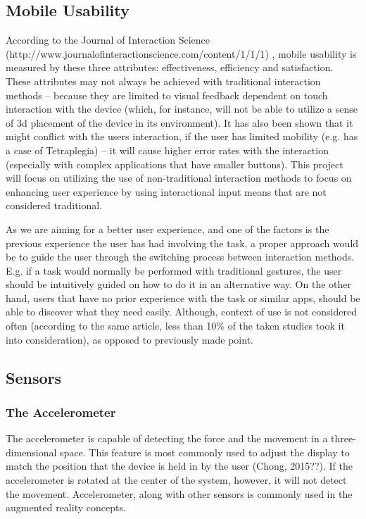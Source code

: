 \subsection{Mobile Usability}
According to the Journal of Interaction Science (http://www.journalofinteractionscience.com/content/1/1/1) , mobile usability is measured by these three attributes: effectiveness, efficiency and satisfaction. These attributes may not always be achieved with traditional interaction methods – because they are limited to visual feedback dependent on touch interaction with the device (which, for instance, will not be able to utilize a sense of 3d placement of the device in its environment). It has also been shown that it might conflict with the users interaction, if the user has limited mobility (e.g. has a case of Tetraplegia) – it will cause higher error rates with the interaction (especially with complex applications that have smaller buttons). This project will focus on utilizing the use of non-traditional interaction methods to focus on enhancing user experience by using interactional input means that are not considered traditional.

As we are aiming for a better user experience, and one of the factors is the previous experience the user has had involving the task, a proper approach would be to guide the user through the switching process between interaction methods. E.g. if a task would normally be performed with traditional gestures, the user should be intuitively guided on how to do it in an alternative way. On the other hand, users that have no prior experience with the task or similar apps, should be able to discover what they need easily. Although, context of use is not considered often (according to the same article, less than 10\% of the taken studies took it into consideration), as opposed to previously made point.

\subsection{Sensors}
\subsubsection*{The Accelerometer}
The accelerometer is capable of detecting the force and the movement in a three-dimensional space. This feature is most commonly used to adjust the display to match the position that the device is held in by the user (Chong, 2015??). If the accelerometer is rotated at the center of the system, however, it will not detect the movement. Accelerometer, along with other sensors is commonly used in the augmented reality concepts.
